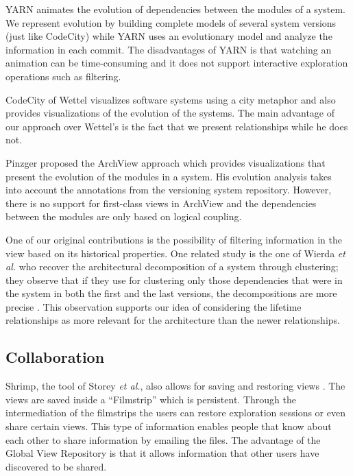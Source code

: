 \documentclass[preprint,12pt]{elsarticle}
\newcommand{\etal}{\emph{et al.}\xspace}
\begin{document}
YARN \cite{hindle-yarn} animates the evolution of dependencies between the modules of a system. We represent evolution by building complete models of several system versions (just like CodeCity) while YARN uses an evolutionary model and analyze the information in each commit. The disadvantages of YARN is that watching an animation can be time-consuming and it does not support interactive exploration operations such as filtering. 

CodeCity of Wettel \cite{wettel-icse11} visualizes software systems using a city metaphor and also provides visualizations of the evolution of the systems. The main advantage of our approach over  Wettel's is the fact that we present relationships while he does not. %

Pinzger proposed the ArchView approach \cite{pinzger-thesis} which provides visualizations that present the evolution of the modules in a system. His evolution analysis takes into account the annotations from the versioning system repository. However, there is no support for first-class views in ArchView and the dependencies between the modules are only based on logical coupling. 

One of our original contributions is the possibility of filtering information in the view based on its historical properties. One related study is the one of Wierda \etal who recover the architectural decomposition of a system through clustering; they observe that if they use for clustering only those dependencies that were in the system in both the first and the last versions, the decompositions are more precise \cite{wierda-clustering}. This observation supports our idea of considering the lifetime relationships as more relevant for the architecture than the newer relationships. 

\subsection {Collaboration} 

Shrimp, the tool of Storey \etal, also allows for saving and restoring views \cite{rayside-flow}. The views are saved inside a ``Filmstrip'' which is persistent. Through the intermediation of the filmstrips the users can restore exploration sessions or even share certain views. This type of information enables people that know about each other to share information by emailing the files. The advantage of the Global View Repository is that it {allows information that other users have discovered to be shared}.
\end{document}
